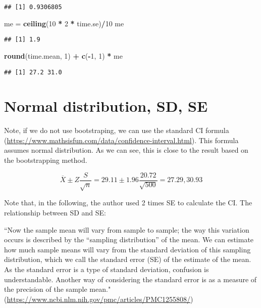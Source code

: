\documentclass[]{book}
\newenvironment{Shaded}{\begin{snugshade}}{\end{snugshade}}
\newcommand{\DecValTok}[1]{\textcolor[rgb]{0.00,0.00,0.81}{#1}}
\newcommand{\KeywordTok}[1]{\textcolor[rgb]{0.13,0.29,0.53}{\textbf{#1}}}
\newcommand{\NormalTok}[1]{#1}
\newcommand{\OperatorTok}[1]{\textcolor[rgb]{0.81,0.36,0.00}{\textbf{#1}}}
\newcommand{\StringTok}[1]{\textcolor[rgb]{0.31,0.60,0.02}{#1}}
\begin{document}
\begin{verbatim}
## [1] 0.9306805
\end{verbatim}

\begin{Shaded}
\begin{Highlighting}[]
\NormalTok{me =}\StringTok{ }\KeywordTok{ceiling}\NormalTok{(}\DecValTok{10} \OperatorTok{*}\StringTok{ }\DecValTok{2} \OperatorTok{*}\StringTok{ }\NormalTok{time.se)}\OperatorTok{/}\DecValTok{10}
\NormalTok{me}
\end{Highlighting}
\end{Shaded}

\begin{verbatim}
## [1] 1.9
\end{verbatim}

\begin{Shaded}
\begin{Highlighting}[]
\KeywordTok{round}\NormalTok{(time.mean, }\DecValTok{1}\NormalTok{) }\OperatorTok{+}\StringTok{ }\KeywordTok{c}\NormalTok{(}\OperatorTok{-}\DecValTok{1}\NormalTok{, }\DecValTok{1}\NormalTok{) }\OperatorTok{*}\StringTok{ }\NormalTok{me}
\end{Highlighting}
\end{Shaded}

\begin{verbatim}
## [1] 27.2 31.0
\end{verbatim}

\hypertarget{normal-distribution-sd-se}{%
\section{Normal distribution, SD, SE}\label{normal-distribution-sd-se}}

Note, if we do not use bootstraping, we can use the standard CI formula (\url{https://www.mathsisfun.com/data/confidence-interval.html}). This formula assumes normal distribution. As we can see, this is close to the result based on the bootstrapping method.

\[\overline{X} \pm Z \frac{S}{\sqrt{n}}=29.11 \pm 1.96 \frac{20.72}{\sqrt{500}}=27.29, 30.93\]

Note that, in the following, the author used 2 times SE to calculate the CI. The relationship between SD and SE:

``Now the sample mean will vary from sample to sample; the way this variation occurs is described by the ``sampling distribution'' of the mean. We can estimate how much sample means will vary from the standard deviation of this sampling distribution, which we call the standard error (SE) of the estimate of the mean. As the standard error is a type of standard deviation, confusion is understandable. Another way of considering the standard error is as a measure of the precision of the sample mean." (\url{https://www.ncbi.nlm.nih.gov/pmc/articles/PMC1255808/})
\end{document}
